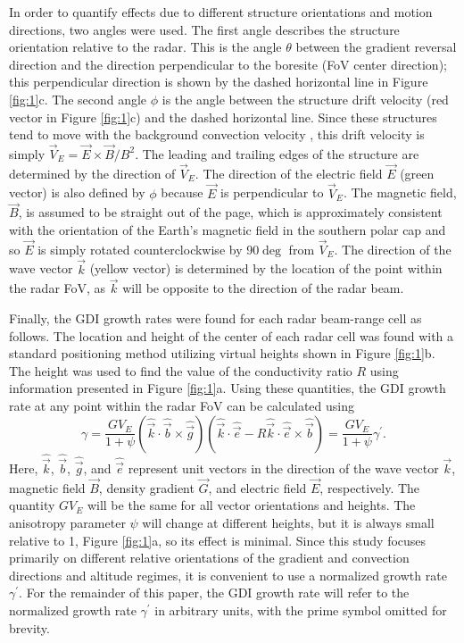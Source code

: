 In order to quantify effects due to different structure orientations and motion directions, two angles were used. The first angle describes the structure orientation relative to the radar. This is the angle \(\theta\) between the gradient reversal direction and the direction perpendicular to the boresite (FoV center direction); this perpendicular direction is shown by the dashed horizontal line in Figure \ref{fig:1}c. The second angle \(\phi\) is the angle between the structure drift velocity (red vector in Figure \ref{fig:1}c) and the dashed horizontal line. Since these structures tend to move with the background convection velocity \citep{Makarevich2015b}, this drift velocity is simply \(\vec{V}_E= \vec{E}\times\vec{B}/B^2\). The leading and trailing edges of the structure are determined by the direction of \(\vec{V}_E\).  The direction of the electric field \(\vec{E}\) (green vector) is also defined by \(\phi\) because \(\vec{E}\) is perpendicular to \(\vec{V}_E\). The magnetic field, \(\vec{B}\), is assumed to be straight out of the page, which is approximately consistent with the orientation of the Earth's magnetic field in the southern polar cap and so \(\vec{E}\) is simply rotated counterclockwise by 90\(\deg\) from \(\vec{V}_E\). The direction of the wave vector \(\vec{k}\) (yellow vector) is determined by the location of the point within the radar FoV, as \(\vec{k}\) will be opposite to the direction of the radar beam.

Finally, the GDI growth rates were found for each radar beam-range cell as follows. The location and height of the center of each radar cell was found with a standard positioning method utilizing virtual heights shown in Figure \ref{fig:1}b. The height was used to find the value of the conductivity ratio \(R\) using information presented in Figure \ref{fig:1}a.  Using these quantities, the GDI growth rate at any point within the radar FoV can be calculated \citep[eqn. 18]{Makarevich2014c} using
\begin{equation}
\label{eqn:Mak14gr}
\gamma = \frac{GV_E}{1+\psi}\left(\hat{\vec{k}}\cdot\hat{\vec{b}}\times\hat{\vec{g}}\right)\left(\hat{\vec{k}}\cdot\hat{\vec{e}}-R\hat{\vec{k}}\cdot\hat{\vec{e}}\times\hat{\vec{b}}\right) = \frac{GV_E}{1+\psi}\gamma^\prime.
\end{equation}
Here, \(\hat{\vec{k}}\), \(\hat{\vec{b}}\), \(\hat{\vec{g}}\), and \(\hat{\vec{e}}\) represent unit vectors in the direction of the wave vector \(\vec{k}\), magnetic field \(\vec{B}\), density gradient \(\vec{G}\), and electric field \(\vec{E}\), respectively.  The quantity \(GV_E\) will be the same for all vector orientations and heights. The anisotropy parameter \(\psi\) will change at different heights, but it is always small relative to 1, Figure \ref{fig:1}a, so its effect is minimal.  Since this study focuses primarily on different relative orientations of the gradient and convection directions and altitude regimes, it is convenient to use a normalized growth rate \(\gamma^\prime\).  For the remainder of this paper, the GDI growth rate will refer to the normalized growth rate \(\gamma^\prime\) in arbitrary units, with the prime symbol omitted for brevity.



